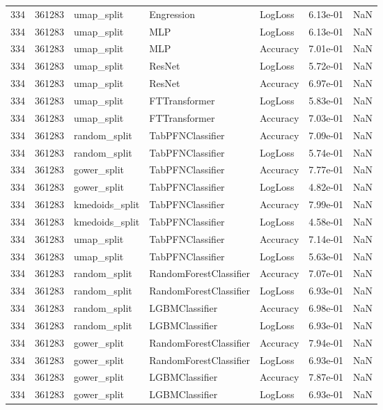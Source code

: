 \begin{tabular}{rrlllrr}
334 & 361283 & umap\_split & Engression & LogLoss & 6.13e-01 & NaN \\
334 & 361283 & umap\_split & MLP & LogLoss & 6.13e-01 & NaN \\
334 & 361283 & umap\_split & MLP & Accuracy & 7.01e-01 & NaN \\
334 & 361283 & umap\_split & ResNet & LogLoss & 5.72e-01 & NaN \\
334 & 361283 & umap\_split & ResNet & Accuracy & 6.97e-01 & NaN \\
334 & 361283 & umap\_split & FTTransformer & LogLoss & 5.83e-01 & NaN \\
334 & 361283 & umap\_split & FTTransformer & Accuracy & 7.03e-01 & NaN \\
334 & 361283 & random\_split & TabPFNClassifier & Accuracy & 7.09e-01 & NaN \\
334 & 361283 & random\_split & TabPFNClassifier & LogLoss & 5.74e-01 & NaN \\
334 & 361283 & gower\_split & TabPFNClassifier & Accuracy & 7.77e-01 & NaN \\
334 & 361283 & gower\_split & TabPFNClassifier & LogLoss & 4.82e-01 & NaN \\
334 & 361283 & kmedoids\_split & TabPFNClassifier & Accuracy & 7.99e-01 & NaN \\
334 & 361283 & kmedoids\_split & TabPFNClassifier & LogLoss & 4.58e-01 & NaN \\
334 & 361283 & umap\_split & TabPFNClassifier & Accuracy & 7.14e-01 & NaN \\
334 & 361283 & umap\_split & TabPFNClassifier & LogLoss & 5.63e-01 & NaN \\
334 & 361283 & random\_split & RandomForestClassifier & Accuracy & 7.07e-01 & NaN \\
334 & 361283 & random\_split & RandomForestClassifier & LogLoss & 6.93e-01 & NaN \\
334 & 361283 & random\_split & LGBMClassifier & Accuracy & 6.98e-01 & NaN \\
334 & 361283 & random\_split & LGBMClassifier & LogLoss & 6.93e-01 & NaN \\
334 & 361283 & gower\_split & RandomForestClassifier & Accuracy & 7.94e-01 & NaN \\
334 & 361283 & gower\_split & RandomForestClassifier & LogLoss & 6.93e-01 & NaN \\
334 & 361283 & gower\_split & LGBMClassifier & Accuracy & 7.87e-01 & NaN \\
334 & 361283 & gower\_split & LGBMClassifier & LogLoss & 6.93e-01 & NaN \\

\end{tabular}
